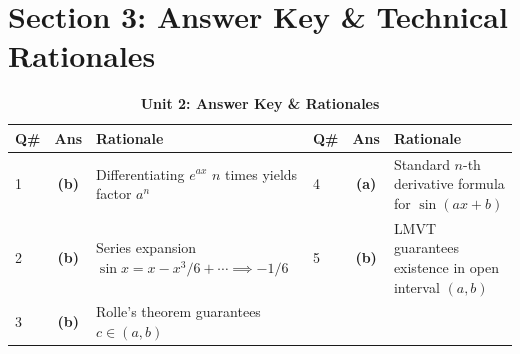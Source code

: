 \newpage
\section{Section 3: Answer Key \& Technical Rationales}

\begin{table}[htbp]
\centering
\caption{\textbf{Unit 2: Answer Key \& Rationales}}
\vspace{2mm}
\begin{tabularx}{\textwidth}{l c X l c X}
\toprule
\textbf{Q\#} & \textbf{Ans} & \textbf{Rationale} & \textbf{Q\#} & \textbf{Ans} & \textbf{Rationale} \\
\midrule
1 & \textbf{(b)} & Differentiating $e^{ax}$ $n$ times yields factor $a^n$ & 4 & \textbf{(a)} & Standard $n$-th derivative formula for $\sin(ax+b)$ \\
2 & \textbf{(b)} & Series expansion $\sin x = x - x^3/6 + \cdots \implies -1/6$ & 5 & \textbf{(b)} & LMVT guarantees existence in open interval $(a,b)$ \\
3 & \textbf{(b)} & Rolle's theorem guarantees $c \in (a, b)$ & & & \\
\bottomrule
\end{tabularx}
\end{table}
